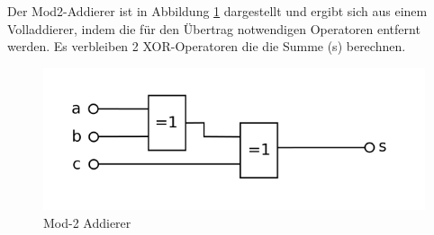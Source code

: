 Der Mod2-Addierer ist in Abbildung \ref{fig:lastadder} dargestellt und ergibt sich aus einem Volladdierer, indem die für den Übertrag notwendigen
Operatoren entfernt werden. Es verbleiben 2 XOR-Operatoren die die Summe (s) berechnen.
\begin{figure}[!h]
  \centering
  \includegraphics[scale=1]{images/lastadder}
  \caption[Mod-2 Addierer]{Mod-2 Addierer\protect\footnotemark}
  \label{fig:lastadder}
\end{figure}
